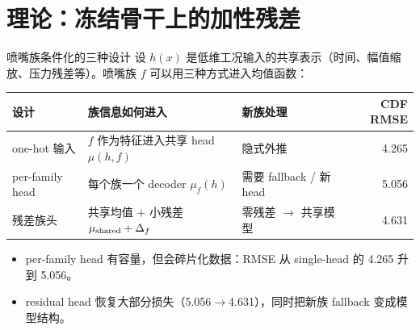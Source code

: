 \documentclass[UTF8,aspectratio=169]{ctexbeamer}
\newcommand{\good}[1]{\textcolor{green!45!black}{#1}}
\newcommand{\warn}[1]{\textcolor{red!65!black}{#1}}
\begin{document}
\section{理论：冻结骨干上的加性残差}

\begin{frame}{喷嘴族条件化的三种设计}
\small
设 $h(x)$ 是低维工况输入的共享表示（时间、幅值缩放、压力残差等）。喷嘴族 $f$ 可以用三种方式进入均值函数：

\vspace{0.2em}
\begin{center}
\renewcommand{\arraystretch}{1.22}
\setlength{\tabcolsep}{3.8pt}
\begin{tabular}{@{}L{3.0cm}L{4.4cm}L{2.8cm}r@{}}
\toprule
\textbf{设计} & \textbf{族信息如何进入} & \textbf{新族处理} & \textbf{CDF RMSE} \\
\midrule
one-hot 输入 & $f$ 作为特征进入共享 head $\mu(h,f)$ & 隐式外推 & 4.265 \\
per-family head & 每个族一个 decoder $\mu_f(h)$ & \warn{需要 fallback / 新 head} & 5.056 \\
残差族头 & 共享均值 $+$ 小残差 $\mu_{\rm shared}+\Delta_f$ & \good{零残差 $\to$ 共享模型} & 4.631 \\
\bottomrule
\end{tabular}
\end{center}

\vspace{0.15em}
\begin{itemize}\setlength\itemsep{1pt}
  \item per-family head 有容量，但会碎片化数据：RMSE 从 single-head 的 4.265 升到 5.056。
  \item residual head 恢复大部分损失（5.056$\to$4.631），同时把新族 fallback 变成模型结构。
\end{itemize}
\end{frame}
\end{document}
